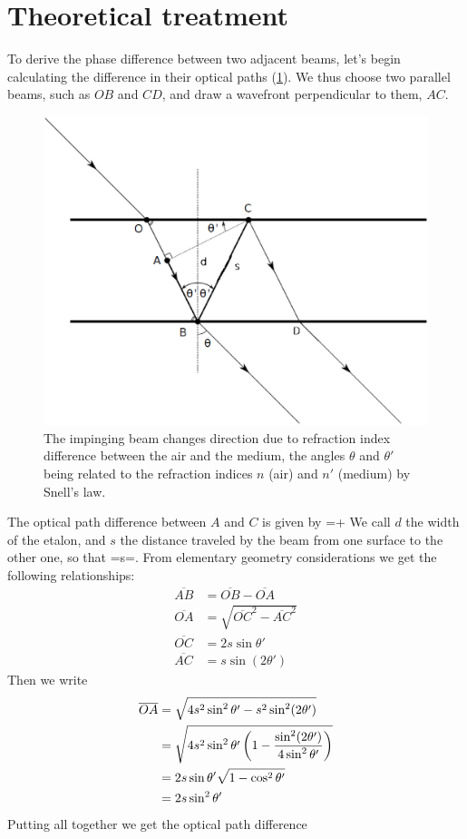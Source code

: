 	\section{Theoretical treatment}
To derive the phase difference between two adjacent beams, let's begin calculating the difference in their optical paths (\cref{fig:angoli}). We thus choose two parallel beams, such as $OB$ and $CD$, and draw a wavefront perpendicular to them, $AC$. 
\begin{figure}[!htb]\centering
\includegraphics[width=.8\linewidth, draft=\foto]{eps/angoli.eps}
\caption{The impinging beam changes direction due to refraction index difference between the air and the medium, the angles $\theta$ and $\theta'$ being related to the refraction indices $n$ (air) and $n'$ (medium) by Snell's law.}
\label{fig:angoli}
\end{figure}
The optical path difference between $A$ and $C$ is given by
\mate
{}=+
\atem
 We call $d$ the width of the etalon, and $s$ the distance traveled by the beam from one surface to the other one, so that
\mate
{}=\equiv s=.
\atem
From elementary geometry considerations we get the following relationships:
\begin{align}
\overline{AB}&=\overline{OB}-\overline{OA}\\
\overline{OA}&=\sqrt{\overline{OC}^2-\overline{AC}^2}\\
\overline{OC}&=2s\sin\theta'\\
\overline{AC}&=s\sin(2\theta')
\end{align}
Then we write
\begin{align}
\overline{OA}&=\sqrt{4s^2\sin^2\theta'-s^2\sin^2(2\theta')}
\nonumber\\&= \sqrt{4s^2\sin^2\theta'\left(1-\frac{\sin^2(2\theta')}{4\sin^2\theta'}\right)}
\nonumber\\&= 2s\sin\theta'\sqrt{1-\cos^2\theta'}
\nonumber\\&= 2s\sin^2\theta'
\end{align}
Putting all together we get the optical path difference

